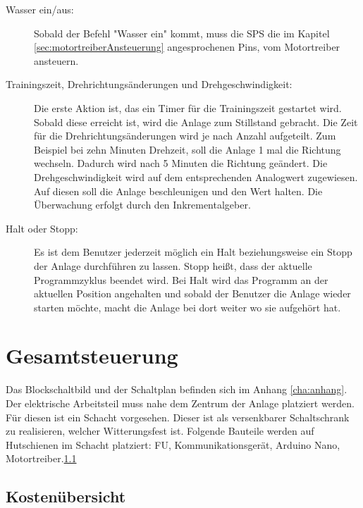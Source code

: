 \begin{description}
\item[Wasser ein/aus:]
Sobald der Befehl "Wasser ein" kommt, muss die SPS die im Kapitel \ref{sec:motortreiberAnsteuerung} angesprochenen Pins, vom Motortreiber ansteuern.

\item[Trainingszeit, Drehrichtungsänderungen und Drehgeschwindigkeit:]
Die erste Aktion ist, das ein Timer für die Trainingszeit gestartet wird. Sobald diese erreicht ist, wird die Anlage zum Stillstand gebracht. Die Zeit für die Drehrichtungsänderungen wird je nach Anzahl aufgeteilt. Zum Beispiel bei zehn Minuten Drehzeit, soll die Anlage 1 mal die Richtung wechseln. Dadurch wird nach 5 Minuten die Richtung geändert. Die Drehgeschwindigkeit wird auf dem entsprechenden Analogwert zugewiesen. Auf diesen soll die Anlage beschleunigen und den Wert halten. Die Überwachung erfolgt durch den Inkrementalgeber. 

\item[Halt oder Stopp:]
Es ist dem Benutzer jederzeit möglich ein Halt beziehungsweise ein Stopp der Anlage durchführen zu lassen. Stopp heißt, dass der aktuelle Programmzyklus beendet wird. Bei Halt wird das Programm an der aktuellen Position angehalten und sobald der Benutzer die Anlage wieder starten möchte, macht die Anlage bei dort weiter wo sie aufgehört hat. 

\end{description}

\newpage

\section{Gesamtsteuerung}
\label{sec:gesamtsteuerung}

Das Blockschaltbild und der Schaltplan befinden sich im Anhang \ref{cha:anhang}.
Der elektrische Arbeitsteil muss nahe dem Zentrum der Anlage platziert werden. Für diesen ist ein Schacht vorgesehen. Dieser ist als versenkbarer Schaltschrank zu realisieren, welcher Witterungsfest ist. Folgende Bauteile werden auf Hutschienen im Schacht platziert: \ac{FU}, Kommunikationsgerät, Arduino Nano, Motortreiber.\ref{sec:kostenuebersicht}

\subsection{Kostenübersicht}
\label{sec:kostenuebersicht}

